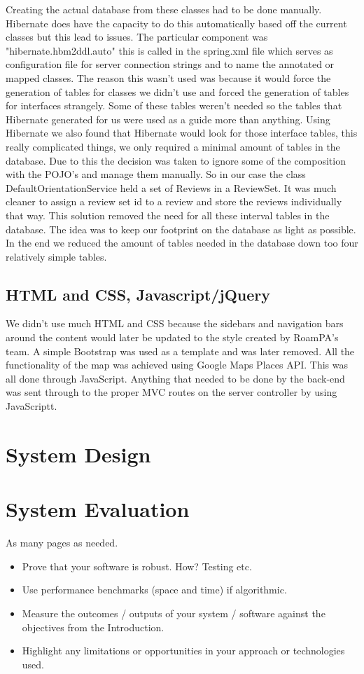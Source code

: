 Creating the actual database from these classes had to be done manually. Hibernate does have the capacity to do this automatically based off the current classes but this lead to issues. The particular component was "hibernate.hbm2ddl.auto" this is called in the spring.xml file which serves as configuration file for server connection strings and to name the annotated or mapped classes. The reason this wasn't used was because it would force the generation of tables for classes we didn't use and forced the generation of tables for interfaces strangely. Some of these tables weren't needed so the tables that Hibernate generated for us were used as a guide more than anything. Using Hibernate we also found that Hibernate would look for those interface tables, this really complicated things, we only required a minimal amount of tables in the database. Due to this the decision was taken to ignore some of the composition with the POJO's and manage them manually. So in our case the class DefaultOrientationService held a set of Reviews in a ReviewSet. It was much cleaner to assign a review set id to a review and store the reviews individually that way. This solution removed the need for all these interval tables in the database. The idea was to keep our footprint on the database as light as possible. In the end we reduced the amount of tables needed in the database down too four relatively simple tables.

\section{HTML and CSS, Javascript/jQuery}

We didn't use much HTML and CSS because the sidebars and navigation bars around the content would later be updated to the style created by RoamPA's team. A simple Bootstrap was used as a template and was later removed. All the functionality of the map was achieved using Google Maps Places API. This was all done through JavaScript. Anything that needed to be done by the back-end was sent through to the proper MVC routes on the server controller by using JavaScriptt.

\chapter{System Design}


\chapter{System Evaluation}
As many pages as needed.
\begin{itemize}
\item Prove that your software is robust. How? Testing etc. 
\item Use performance benchmarks (space and time) if algorithmic.
\item Measure the outcomes / outputs of your system / software against the objectives from the Introduction.
\item Highlight any limitations or opportunities in your approach or technologies used.
\end{itemize}

